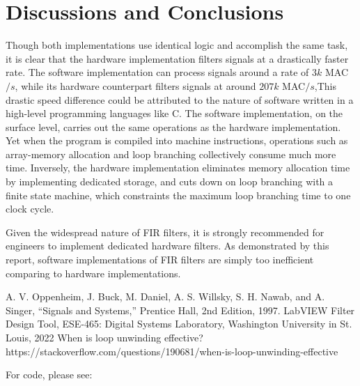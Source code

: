 \documentclass[conference]{IEEEtran}
\begin{document}
\section{Discussions and Conclusions} \label{conclusion}

Though both implementations use identical logic and accomplish the same task, it is clear that the hardware implementation filters signals at a drastically faster rate. The software implementation can process signals around a rate of $3k$ MAC$/s$, while its hardware counterpart filters signals at around $207k$ MAC$/s$,This drastic speed difference could be attributed to the nature of software written in a high-level programming languages like C. The software implementation, on the surface level, carries out the same operations as the hardware implementation. Yet when the program is compiled into machine instructions, operations such as array-memory allocation and loop branching collectively consume much more time. Inversely, the hardware implementation eliminates memory allocation time by implementing dedicated storage, and cuts down on loop branching with a finite state machine, which constraints the maximum loop branching time to one clock cycle. 

Given the widespread nature of FIR filters, it is strongly recommended for engineers to implement dedicated hardware filters. As demonstrated by this report, software implementations of FIR filters are simply too inefficient comparing to hardware implementations.


\begin{thebibliography}{00}
 A. V. Oppenheim, J. Buck, M. Daniel, A. S. Willsky, S. H. Nawab, and A. Singer, ``Signals and Systems,'' Prentice Hall, 2nd Edition, 1997.
 LabVIEW Filter Design Tool, ESE-465: Digital Systems Laboratory, Washington University in St. Louis, 2022
 When is loop unwinding effective?\\ https://stackoverflow.com/questions/190681/when-is-loop-unwinding-effective
\end{thebibliography}

\newpage
\onecolumn
For code, please see: 
\end{document}
